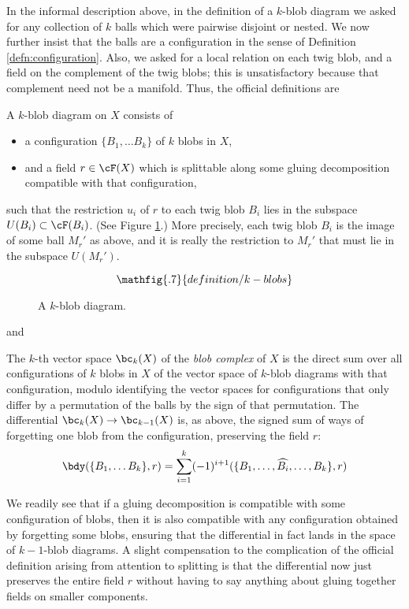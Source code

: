 In the informal description above, in the definition of a $k$-blob diagram we asked for any collection of $k$ balls which were pairwise disjoint or nested. We now further insist that the balls are a configuration in the sense of Definition \ref{defn:configuration}. Also, we asked for a local relation on each twig blob, and a field on the complement of the twig blobs; this is unsatisfactory because that complement need not be a manifold. Thus, the official definitions are
\begin{defn}
\label{defn:blob-diagram}
A $k$-blob diagram on $X$ consists of
\begin{itemize}
\item a configuration $\{B_1, \ldots B_k\}$ of $k$ blobs in $X$,
\item and a field $r \in \cF(X)$ which is splittable along some gluing decomposition compatible with that configuration,
\end{itemize}
such that
the restriction $u_i$ of $r$ to each twig blob $B_i$ lies in the subspace $U(B_i) \subset \cF(B_i)$. (See Figure \ref{blobkdiagram}.) More precisely, each twig blob $B_i$ is the image of some ball $M_r'$ as above, and it is really the restriction to $M_r'$ that must lie in the subspace $U(M_r')$.
\end{defn}
\begin{figure}[t]\begin{equation*}
\mathfig{.7}{definition/k-blobs}
\end{equation*}\caption{A $k$-blob diagram.}\label{blobkdiagram}\end{figure}
and
\begin{defn}
\label{defn:blobs}
The $k$-th vector space $\bc_k(X)$ of the \emph{blob complex} of $X$ is the direct sum over all configurations of $k$ blobs in $X$ of the vector space of $k$-blob diagrams with that configuration, modulo identifying the vector spaces for configurations that only differ by a permutation of the balls by the sign of that permutation. The differential $\bc_k(X) \to \bc_{k-1}(X)$ is, as above, the signed sum of ways of forgetting one blob from the configuration, preserving the field $r$:
\begin{equation*}
\bdy(\{B_1, \ldots B_k\}, r) = \sum_{i=1}^{k} (-1)^{i+1} (\{B_1, \ldots, \widehat{B_i}, \ldots, B_k\}, r)
\end{equation*}
\end{defn}
We readily see that if a gluing decomposition is compatible with some configuration of blobs, then it is also compatible with any configuration obtained by forgetting some blobs, ensuring that the differential in fact lands in the space of $k{-}1$-blob diagrams.
A slight compensation to the complication of the official definition arising from attention to splitting is that the differential now just preserves the entire field $r$ without having to say anything about gluing together fields on smaller components.

